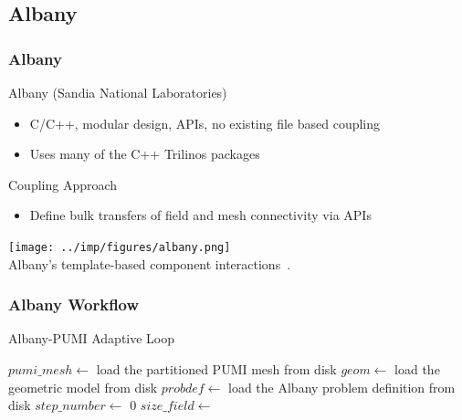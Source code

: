 \documentclass{beamer}
\begin{document}
\subsection{Albany}

\begin{frame}
  \frametitle{Albany}
  Albany (Sandia National Laboratories)
  \begin{itemize}
    \item C/C++, modular design, APIs, no existing file based coupling
    \item Uses many of the C++ Trilinos packages
  \end{itemize}
  Coupling Approach
  \begin{itemize}
    \item Define bulk transfers of field and mesh connectivity via APIs
  \end{itemize}
  \centering
  \texttt{[image: ../imp/figures/albany.png]}\\
  \small
  Albany's template-based component interactions~\cite{albany2016}.
\end{frame}

\begin{frame}
  \frametitle{Albany Workflow}
  \begin{algorithm}[H]
    \caption{Albany-PUMI Adaptive Loop}
    \small
    \begin{algorithmic}[1]
        \State $pumi\_mesh \gets$ load the partitioned PUMI mesh from disk
        \State $geom \gets$ load the geometric model from disk
        \State $probdef \gets$ load the Albany problem definition from disk
        \State {} 
        \State {} 
        \State $step\_number \gets$ 0
          \State {}
          \State {} 
          \State $size\_field \gets$ 
          \State {}
          \State {}
          \State {} 
          \State {} 
          \State {} 
        \EndWhile
      \EndProcedure
    \end{algorithmic}
  \end{algorithm}
\end{frame}
\end{document}
